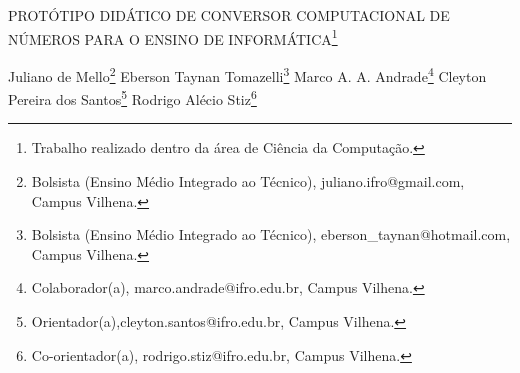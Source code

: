 \documentclass[article,12pt,onesidea,4paper,english,brazil]{abntex2}
\begin{document}
	
	
	\frenchspacing 
	
	\begin{center}
		\LARGE PROTÓTIPO DIDÁTICO DE CONVERSOR COMPUTACIONAL DE NÚMEROS PARA O ENSINO DE INFORMÁTICA\footnote{Trabalho realizado dentro da área de Ciência da Computação.}
		
		\normalsize
		Juliano de Mello\footnote{Bolsista (Ensino Médio Integrado ao Técnico), juliano.ifro@gmail.com, Campus Vilhena.} 
		Eberson Taynan Tomazelli\footnote{Bolsista (Ensino Médio Integrado ao Técnico), eberson\_taynan@hotmail.com, Campus Vilhena.} 
		Marco A. A. Andrade\footnote{Colaborador(a), marco.andrade@ifro.edu.br, Campus Vilhena.} 
		Cleyton Pereira dos Santos\footnote{Orientador(a),cleyton.santos@ifro.edu.br, Campus Vilhena.}
		Rodrigo Alécio Stiz\footnote{Co-orientador(a), rodrigo.stiz@ifro.edu.br, Campus Vilhena.} 
	\end{center}
	
\end{document}
